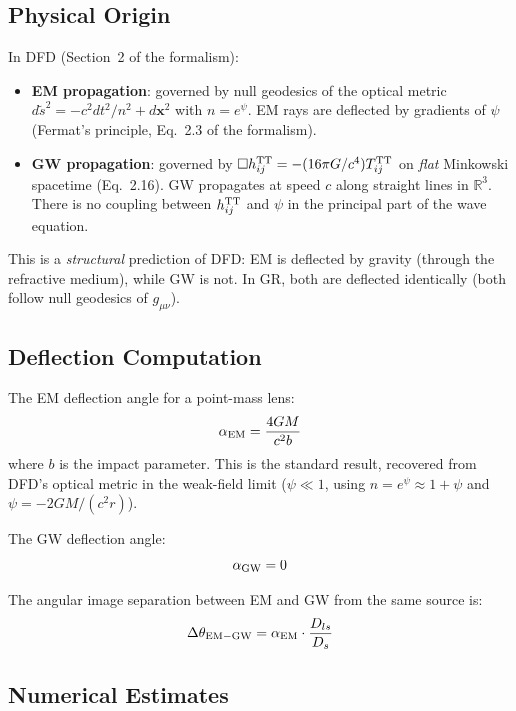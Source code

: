 \documentclass[11pt,a4paper]{article}
\begin{document}
\subsection{Physical Origin}

In DFD (Section~2 of the formalism):
\begin{itemize}
\item \textbf{EM propagation}: governed by null geodesics of the optical
  metric $d\tilde{s}^2 = -c^2 dt^2/n^2 + d\mathbf{x}^2$ with $n = e^\psi$.
  EM rays are deflected by gradients of $\psi$ (Fermat's principle,
  Eq.~2.3 of the formalism).
\item \textbf{GW propagation}: governed by $\Box h_{ij}^{\rm TT} = -(16\pi G/c^4)
  T_{ij}^{\rm TT}$ on \emph{flat} Minkowski spacetime (Eq.~2.16).
  GW propagates at speed $c$ along straight lines in $\mathbb{R}^3$.
  There is no coupling between $h_{ij}^{\rm TT}$ and $\psi$ in the
  principal part of the wave equation.
\end{itemize}

This is a \emph{structural} prediction of DFD: EM is deflected by gravity
(through the refractive medium), while GW is not.  In GR, both are
deflected identically (both follow null geodesics of $g_{\mu\nu}$).

\subsection{Deflection Computation}

The EM deflection angle for a point-mass lens:
\begin{equation}
\alpha_{\rm EM} = \frac{4GM}{c^2 b}
\end{equation}
where $b$ is the impact parameter.  This is the standard result,
recovered from DFD's optical metric in the weak-field limit
($\psi \ll 1$, using $n = e^\psi \approx 1 + \psi$ and
$\psi = -2GM/(c^2 r)$).

The GW deflection angle:
\begin{equation}
\alpha_{\rm GW} = 0
\end{equation}

The angular image separation between EM and GW from the same source is:
\begin{equation}
\Delta\theta_{\rm EM-GW} = \alpha_{\rm EM} \cdot \frac{D_{ls}}{D_s}
\end{equation}

\subsection{Numerical Estimates}
\end{document}
